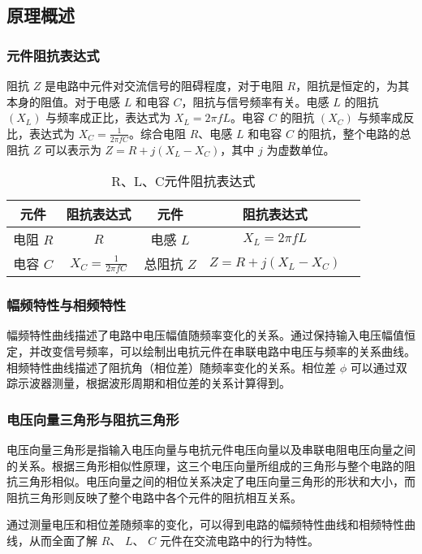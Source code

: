 \documentclass[dvipsnames, svgnames,a4paper,11pt]{article}
\begin{document}
	
	\subsection{原理概述}
	\subsubsection{元件阻抗表达式}
阻抗 \( Z \) 是电路中元件对交流信号的阻碍程度，对于电阻 \( R \)，阻抗是恒定的，为其本身的阻值。对于电感 \( L \) 和电容 \( C \)，阻抗与信号频率有关。电感 \( L \) 的阻抗 \( (X_L) \) 与频率成正比，表达式为 \( X_L = 2\pi fL \)。电容 \( C \) 的阻抗 \( (X_C) \) 与频率成反比，表达式为 \( X_C = \frac{1}{2\pi fC} \)。综合电阻 \( R \)、电感 \( L \) 和电容 \( C \) 的阻抗，整个电路的总阻抗 \( Z \) 可以表示为 \( Z = R + j(X_L - X_C) \)，其中 \( j \) 为虚数单位。
\begin{table}[htbp]
	\centering
	\caption{R、L、C元件阻抗表达式}
	\begin{tabular}{|c|c|c|c|c|}
		\hline
	  元件 & 阻抗表达式 & 元件 & 阻抗表达式 \\ 
	  \hline
	  电阻 \( R \) & \( R \) & 电感 \( L \) & \( X_L = 2\pi fL \) \\
	  \hline
	  电容 \( C \) & \( X_C = \frac{1}{2\pi fC} \) & 总阻抗 \( Z \) & \( Z = R + j(X_L - X_C) \) \\ 
	  \hline
	\end{tabular}
  \end{table}
\subsubsection{幅频特性与相频特性}
幅频特性曲线描述了电路中电压幅值随频率变化的关系。通过保持输入电压幅值恒定，并改变信号频率，可以绘制出电抗元件在串联电路中电压与频率的关系曲线。相频特性曲线描述了阻抗角（相位差）随频率变化的关系。相位差 \( \phi \) 可以通过双踪示波器测量，根据波形周期和相位差的关系计算得到。

\subsubsection{电压向量三角形与阻抗三角形}
电压向量三角形是指输入电压向量与电抗元件电压向量以及串联电阻电压向量之间的关系。根据三角形相似性原理，这三个电压向量所组成的三角形与整个电路的阻抗三角形相似。电压向量之间的相位关系决定了电压向量三角形的形状和大小，而阻抗三角形则反映了整个电路中各个元件的阻抗相互关系。

通过测量电压和相位差随频率的变化，可以得到电路的幅频特性曲线和相频特性曲线，从而全面了解 \( R \)、 \( L \)、 \( C \) 元件在交流电路中的行为特性。
\end{document}
